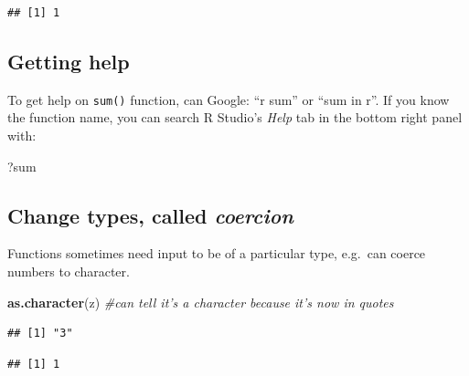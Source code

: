 \documentclass[]{article}
\newenvironment{Shaded}{\begin{snugshade}}{\end{snugshade}}
\newcommand{\KeywordTok}[1]{\textcolor[rgb]{0.13,0.29,0.53}{\textbf{#1}}}
\newcommand{\CommentTok}[1]{\textcolor[rgb]{0.56,0.35,0.01}{\textit{#1}}}
\newcommand{\OtherTok}[1]{\textcolor[rgb]{0.56,0.35,0.01}{#1}}
\newcommand{\NormalTok}[1]{#1}
\begin{document}
\begin{verbatim}
## [1] 1
\end{verbatim}

\subsection{Getting help}\label{getting-help}

To get help on \texttt{sum()} function, can Google: ``r sum'' or ``sum
in r''. If you know the function name, you can search R Studio's
\emph{Help} tab in the bottom right panel with:

\begin{Shaded}
\begin{Highlighting}[]
\NormalTok{?sum}
\end{Highlighting}
\end{Shaded}

\subsection{\texorpdfstring{Change types, called
\emph{coercion}}{Change types, called coercion}}\label{change-types-called-coercion}

Functions sometimes need input to be of a particular type, e.g.~can
coerce numbers to character.

\begin{Shaded}
\begin{Highlighting}[]
\KeywordTok{as.character}\NormalTok{(z) }\CommentTok{#can tell it's a character because it's now in quotes}
\end{Highlighting}
\end{Shaded}

\begin{verbatim}
## [1] "3"
\end{verbatim}

\begin{Shaded}
\end{Shaded}

\begin{verbatim}
## [1] 1
\end{verbatim}

\begin{Shaded}
\end{Shaded}
\end{document}
